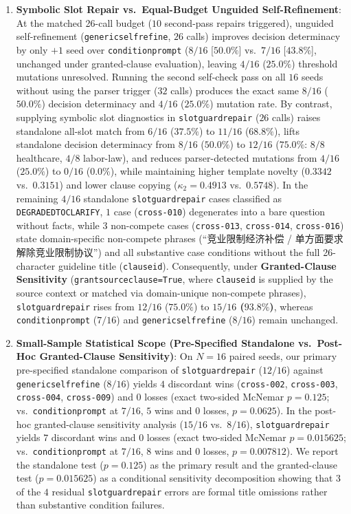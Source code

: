 \documentclass[10pt,twocolumn]{article}
\renewcommand{\_}{\textunderscore\allowbreak}
\begin{document}
\begin{enumerate}[leftmargin=*,nosep]
  \item \textbf{Symbolic Slot Repair vs.\ Equal-Budget Unguided Self-Refinement}: At the matched 26-call budget ($10$ second-pass repairs triggered), unguided self-refinement (\texttt{generic\_self\_refine}, $26$ calls) improves decision determinacy by only $+1$ seed over \texttt{condition\_prompt} ($8/16$ [$50.0\%$] vs.\ $7/16$ [$43.8\%$], unchanged under granted-clause evaluation), leaving $4/16$ ($25.0\%$) threshold mutations unresolved. Running the second self-check pass on all $16$ seeds without using the parser trigger ($32$ calls) produces the exact same $8/16$ ($50.0\%$) decision determinacy and $4/16$ ($25.0\%$) mutation rate. By contrast, supplying symbolic slot diagnostics in \texttt{slot\_guard\_repair} ($26$ calls) raises standalone all-slot match from $6/16$ ($37.5\%$) to $11/16$ ($68.8\%$), lifts standalone decision determinacy from $8/16$ ($50.0\%$) to $12/16$ ($75.0\%$: $8/8$ healthcare, $4/8$ labor-law), and reduces parser-detected mutations from $4/16$ ($25.0\%$) to $0/16$ ($0.0\%$), while maintaining higher template novelty ($0.3342$ vs.\ $0.3151$) and lower clause copying ($\kappa_2 = 0.4913$ vs.\ $0.5748$). In the remaining $4/16$ standalone \texttt{slot\_guard\_repair} cases classified as \texttt{DEGRADED\_TO\_CLARIFY}, $1$ case (\texttt{cross-010}) degenerates into a bare question without facts, while $3$ non-compete cases (\texttt{cross-013}, \texttt{cross-014}, \texttt{cross-016}) state domain-specific non-compete phrases (``竞业限制经济补偿 / 单方面要求解除竞业限制协议'') and all substantive case conditions without the full 26-character guideline title (\texttt{clause\_id}). Consequently, under \textbf{Granted-Clause Sensitivity} (\texttt{grant\_source\_clause=True}, where \texttt{clause\_id} is supplied by the source context or matched via domain-unique non-compete phrases), \texttt{slot\_guard\_repair} rises from $12/16$ ($75.0\%$) to \textbf{$15/16$ ($93.8\%$)}, whereas \texttt{condition\_prompt} ($7/16$) and \texttt{generic\_self\_refine} ($8/16$) remain unchanged.
  \item \textbf{Small-Sample Statistical Scope (Pre-Specified Standalone vs.\ Post-Hoc Granted-Clause Sensitivity)}: On $N=16$ paired seeds, our primary pre-specified standalone comparison of \texttt{slot\_guard\_repair} ($12/16$) against \texttt{generic\_self\_refine} ($8/16$) yields $4$ discordant wins (\texttt{cross-002}, \texttt{cross-003}, \texttt{cross-004}, \texttt{cross-009}) and $0$ losses (exact two-sided McNemar $p=0.125$; vs.\ \texttt{condition\_prompt} at $7/16$, $5$ wins and $0$ losses, $p=0.0625$). In the post-hoc granted-clause sensitivity analysis ($15/16$ vs.\ $8/16$), \texttt{slot\_guard\_repair} yields $7$ discordant wins and $0$ losses (exact two-sided McNemar $p=0.015625$; vs.\ \texttt{condition\_prompt} at $7/16$, $8$ wins and $0$ losses, $p=0.007812$). We report the standalone test ($p=0.125$) as the primary result and the granted-clause test ($p=0.015625$) as a conditional sensitivity decomposition showing that $3$ of the $4$ residual \texttt{slot\_guard\_repair} errors are formal title omissions rather than substantive condition failures.
\end{enumerate}
\end{document}
